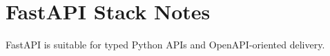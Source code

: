 \section{FastAPI Stack Notes}

FastAPI is suitable for typed Python APIs and OpenAPI-oriented delivery.
